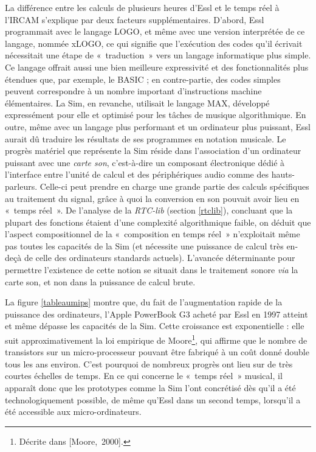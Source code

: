 \documentclass[a4paper,12pt]{article}
\newcommand{\guill}[1]{«~#1~»}
\newcommand{\cicite}[1]{{\footnotesize[#1]}}
\begin{document}
La différence entre les calculs de plusieurs heures d'Essl et le temps réel à l'IRCAM s'explique par deux facteurs supplémentaires. D'abord, Essl programmait avec le langage LOGO, et même avec une version interprétée de ce langage, nommée xLOGO, ce qui signifie que l'exécution des codes qu'il écrivait nécessitait une étape de \guill{traduction} vers un langage informatique plus simple. Ce langage offrait aussi une bien meilleure expressivité et des fonctionnalités plus étendues que, par exemple, le BASIC ; en contre-partie, des codes simples peuvent correspondre à un nombre important d'instructions machine élémentaires. La Sim, en revanche, utilisait le langage MAX, développé expressément pour elle et optimisé pour les tâches de musique algorithmique. En outre, même avec un langage plus performant et un ordinateur plus puissant, Essl aurait dû traduire les résultats de ses programmes en notation musicale. Le progrès matériel que représente la Sim réside dans l'association d'un ordinateur puissant avec une \emph{carte son}, c'est-à-dire un composant électronique dédié à l'interface entre l'unité de calcul et des périphériques audio comme des hauts-parleurs. Celle-ci peut prendre en charge une grande partie des calculs spécifiques au traitement du signal, grâce à quoi la conversion en son pouvait avoir lieu en \guill{temps réel}. De l'analyse de la \emph{RTC-lib} (section \ref{rtclib}), concluant que la plupart des fonctions étaient d'une complexité algorithmique faible, on déduit que l'aspect compositionnel de la \guill{composition en temps réel} n'exploitait même pas toutes les capacités de la Sim (et nécessite une puissance de calcul très en-deçà de celle des ordinateurs standards actuels). L'avancée déterminante pour permettre l'existence de cette notion se situait dans le traitement sonore \emph{via} la carte son, et non dans la puissance de calcul brute.

La figure \ref{tableaumips} montre que, du fait de l'augmentation rapide de la puissance des ordinateurs, l'Apple PowerBook G3 acheté par Essl en 1997 atteint et même dépasse les capacités de la Sim. Cette croissance est exponentielle : elle suit approximativement la loi empirique de Moore\footnote{Décrite dans \cicite{Moore,~2000}.}, qui affirme que le nombre de transistors sur un micro-processeur pouvant être fabriqué à un coût donné double tous les ans environ. C'est pourquoi de nombreux progrès ont lieu sur de très courtes échelles de temps. En ce qui concerne le \guill{temps réel} musical, il apparaît donc que les prototypes comme la Sim l'ont concrétisé dès qu'il a été technologiquement possible, de même qu'Essl dans un second temps, lorsqu'il a été accessible aux micro-ordinateurs.
\end{document}
